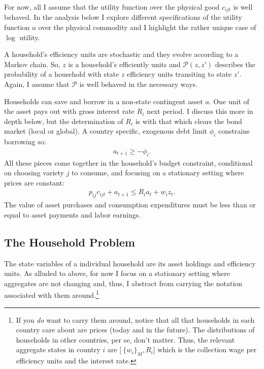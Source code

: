\documentclass[12pt,pdftex]{article}
\begin{document}
\begin{onehalfspacing}
For now, all I assume that the utility function over the physical good $c_{ijt}$ is well behaved. In the analysis below I explore different specifications of the utility function $u$ over the physical commodity and I highlight the rather unique case of $\log$ utility.

A household's efficiency units are stochastic and they evolve according to a Markov chain. So, $z$ is a household's efficiently units and $\mathcal{P}(z,z')$ describes the probability of a household with state $z$ efficiency units transiting to state $z'$. Again, I assume that $\mathcal{P}$ is well behaved in the necessary ways.

Households can save and borrow in a non-state contingent asset $a$. One unit of the asset pays out with gross interest rate $R_i$ next period. I discuss this more in depth below, but the determination of $R_{i}$ is with that which clears the bond market (local or global). A country specific, exogenous debt limit $\phi_{i}$ constrains borrowing so:
\begin{align}
a_{t+1} \geq - \phi_{i}.
\label{eq:borrowing-constraint}
\end{align}
All these pieces come together in the household's budget constraint, conditional on choosing variety $j$ to consume, and focusing on a stationary setting where prices are constant:
\begin{align}
p_{ij}c_{ijt} +  a_{t+1} \leq    R_{i} a_{t} + w_{i} z_{t}.\label{eq:trade-budget-constraint}
\end{align}
The value of asset purchases and consumption expenditures must be less than or equal to asset payments and labor earnings.

\subsection{The Household Problem}

The state variables of a individual household are its asset holdings and efficiency units. As alluded to above, for now I focus on a stationary setting where aggregates are not changing and, thus, I abstract from carrying the notation associated with them around.\footnote{If you \emph{do} want to carry them around, notice that all that households in each country care about are prices (today and in the future). The distributions of households in other countries, per se, don't matter. Thus, the relevant aggregate states in country $i$ are $\big [ \ \{ w_i \}_{M}, R_i \big ]$ which is the collection wage per efficiency units and the interest rate.}


\end{onehalfspacing}
\end{document}
